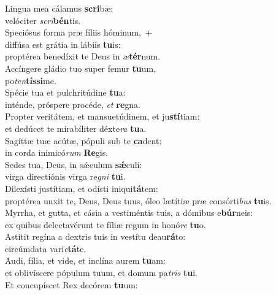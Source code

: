 \evenverse Lingua mea cálamus \textbf{scri}bæ:~\*\\
\evenverse velóciter \textit{scri}\textbf{bén}tis.\\
\oddverse Speciósus forma præ fíliis hóminum,~+\\
\oddverse  diffúsa est grátia in lábiis \textbf{tu}is:~\*\\
\oddverse proptérea benedíxit te Deus in \textit{æ}\textbf{tér}num.\\
\evenverse Accíngere gládio tuo super femur \textbf{tu}um,~\*\\
\evenverse po\textit{ten}\textbf{tís}\textbf{si}me.\\
\oddverse Spécie tua et pulchritúdine \textbf{tu}a:~\*\\
\oddverse inténde, próspere procéde, \textit{et} \textbf{re}gna.\\
\evenverse Propter veritátem, et mansuetúdinem, et ju\textbf{stí}tiam:~\*\\
\evenverse et dedúcet te mirabíliter déxte\textit{ra} \textbf{tu}a.\\
\oddverse Sagíttæ tuæ acútæ, pópuli sub te \textbf{ca}dent:~\*\\
\oddverse in corda inimicó\textit{rum} \textbf{Re}gis.\\
\evenverse Sedes tua, Deus, in sǽculum \textbf{sǽ}culi:~\*\\
\evenverse virga directiónis virga re\textit{gni} \textbf{tu}i.\\
\oddverse Dilexísti justítiam, et odísti iniqui\textbf{tá}tem:~\*\\
\oddverse proptérea unxit te, Deus, Deus tuus, óleo lætítiæ præ consórti\textit{bus} \textbf{tu}is.\\
\evenverse Myrrha, et gutta, et cásia a vestiméntis tuis, a dómibus e\textbf{búr}neis:~\*\\
\evenverse ex quibus delectavérunt te fíliæ regum in honó\textit{re} \textbf{tu}o.\\
\oddverse Astitit regína a dextris tuis in vestítu deau\textbf{rá}to:~\*\\
\oddverse circúmdata vari\textit{e}\textbf{tá}te.\\
\evenverse Audi, fília, et vide, et inclína aurem \textbf{tu}am:~\*\\
\evenverse et oblivíscere pópulum tuum, et domum pa\textit{tris} \textbf{tu}i.\\
\oddverse Et concupíscet Rex decórem \textbf{tu}um:~\*\\
